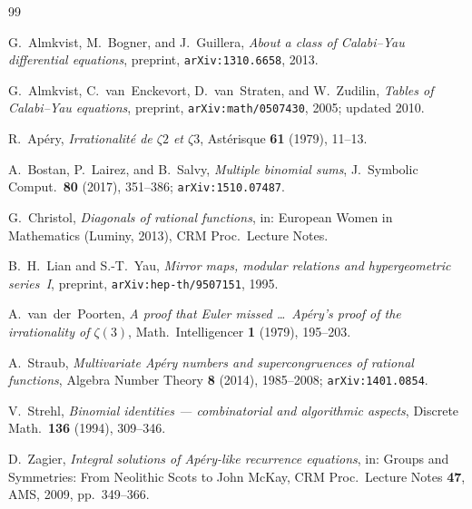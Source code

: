 \documentclass[12pt,reqno]{amsart}
\theoremstyle{plain}
\theoremstyle{definition}
\theoremstyle{remark}
\begin{document}
\begin{thebibliography}{99}

G.~Almkvist, M.~Bogner, and J.~Guillera,
\emph{About a class of Calabi--Yau differential equations},
preprint, \texttt{arXiv:1310.6658}, 2013.

G.~Almkvist, C.~van~Enckevort, D.~van~Straten, and W.~Zudilin,
\emph{Tables of Calabi--Yau equations},
preprint, \texttt{arXiv:math/0507430}, 2005; updated 2010.

R.~Ap\'ery,
\emph{Irrationalit\'e de $\zeta 2$ et $\zeta 3$},
Ast\'erisque \textbf{61} (1979), 11--13.

A.~Bostan, P.~Lairez, and B.~Salvy,
\emph{Multiple binomial sums},
J.~Symbolic Comput.\ \textbf{80} (2017), 351--386;
\texttt{arXiv:1510.07487}.

G.~Christol,
\emph{Diagonals of rational functions},
in: European Women in Mathematics (Luminy, 2013), CRM Proc.\ Lecture Notes.

B.~H.~Lian and S.-T.~Yau,
\emph{Mirror maps, modular relations and hypergeometric series~I},
preprint, \texttt{arXiv:hep-th/9507151}, 1995.

A.~van~der~Poorten,
\emph{A proof that Euler missed \ldots\ Ap\'ery's proof of the
irrationality of $\zeta(3)$},
Math.\ Intelligencer \textbf{1} (1979), 195--203.

A.~Straub,
\emph{Multivariate Ap\'ery numbers and supercongruences of
rational functions},
Algebra Number Theory \textbf{8} (2014), 1985--2008;
\texttt{arXiv:1401.0854}.

V.~Strehl,
\emph{Binomial identities --- combinatorial and algorithmic
aspects},
Discrete Math.\ \textbf{136} (1994), 309--346.

D.~Zagier,
\emph{Integral solutions of Ap\'ery-like recurrence equations},
in: Groups and Symmetries: From Neolithic Scots to John McKay,
CRM Proc.\ Lecture Notes \textbf{47}, AMS, 2009, pp.~349--366.

\end{thebibliography}
\end{document}
